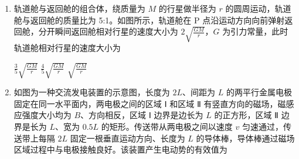 \documentclass[\gkver]{gaokaozhenti}
\begin{document}
\begin{enumerate}

\item
轨道舱与返回舱的组合体，绕质量为 $M$ 的行星做半径为 $r$ 的圆周运动，轨道舱与返回舱的质量比为 5:1。如图所示，轨道舱在 P 点沿运动方向向前弹射返回舱，分开瞬间返回舱相对行星的速度大小为 $2\sqrt{\frac{GM}{r}}$，$G$ 为引力常量，此时轨道舱相对行星的速度大小为


{$\frac{3}{5}\sqrt{\frac{GM}{r}}$}
{$\frac{4}{5}\sqrt{\frac{GM}{r}}$}
{$\sqrt{\frac{GM}{r}}$}


\item
如图为一种交流发电装置的示意图，长度为 $2L$、间距为 $L$ 的两平行金属电极固定在同一水平面内，两电极之间的区域 Ⅰ 和区域 Ⅱ 有竖直方向的磁场，磁感应强度大小均为 $B$、方向相反，区域 Ⅰ 边界是边长为 $L$ 的正方形，区域 Ⅱ 边界是长为 $L$、宽为 $0.5L$ 的矩形。传送带从两电极之间以速度 $v$ 匀速通过，传送带上每隔 $2L$ 固定一根垂直运动方向、长度为 $L$ 的导体棒，导体棒通过磁场区域过程中与电极接触良好。该装置产生电动势的有效值为


\end{enumerate}
\end{document}
